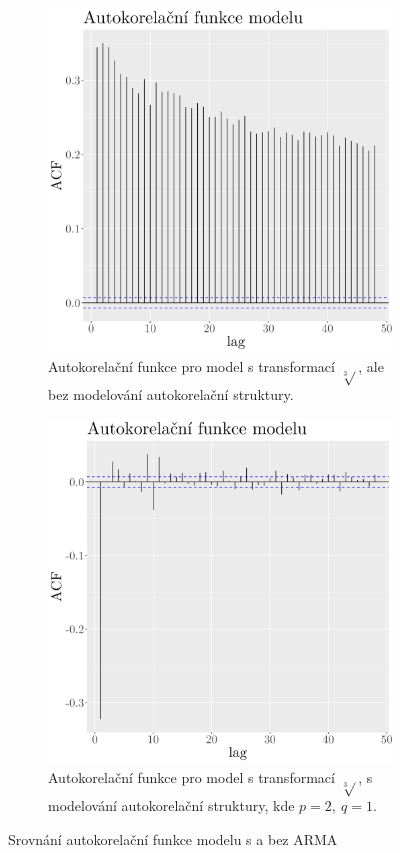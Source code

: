 \begin{figure}
	\centering
	\begin{subfigure}{0.45\textwidth}
  \includegraphics[width=\textwidth]{img/ch2/acf_curt.png}
		\caption{Autokorelační funkce pro model s transformací $\sqrt[3]{}$, ale bez modelování autokorelační struktury.}
		\label{fig:acf_curtnoARMA}
	\end{subfigure}
	\hfill
	\begin{subfigure}{0.45\textwidth}
  \includegraphics[width=\textwidth]{img/ch2/acf_curtARMA22.png}
		\caption{Autokorelační funkce pro model s transformací $\sqrt[3]{}$, s modelování autokorelační struktury, kde $p=2,\ q=1$.}
		\label{fig:acf_curtARMA22}
	\end{subfigure}
	\caption{Srovnání autokorelační funkce modelu s a bez ARMA}
	\label{fig:acf_curt}
\end{figure}

